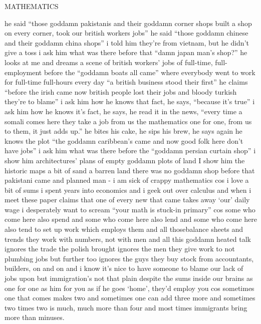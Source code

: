 %
%
%
%
MATHEMATICS

he said
“those goddamn pakistanis and their goddamn corner shops
built a shop on every corner, took our british workers jobs”
he said
“those goddamn chinese and their goddamn china shops”
i told him they’re from vietnam, but he didn’t give a toss
i ask him what was there before that “damn japan man’s shop?”
he looks at me and dreams a scene of british workers’ jobs
of full-time, full-employment before the “goddamn boats all came”
where everybody went to work for full-time full-hours every day
“a british business stood their first”
he claims
“before the irish came
now british people lost their jobs and bloody turkish they're to blame”
i ask him how he knows that fact, he says, “because it’s true”
i ask him how he knows it’s fact, he says, he read it in the news,
“every time a somali comes here they take a job from us
the mathematics one for one, from us to them, it just adds up.”
he bites his cake, he sips his brew, he says again he knows the plot
“the goddamn caribbean’s came and now good folk here don’t have jobs”
i ask him what was there before the “goddamn persian curtain shop”
i show him architectures’ plans
of empty goddamn plots of land
I show him the historic maps
a bit of sand
a barren land
there was no goddamn shop before that pakistani came and planned
man - i am sick of crappy mathematics
cos i love a bit of sums
i spent years into economics
and i geek out over calculus
and when i meet these paper claims
that one of every new that came
takes away ‘our’ daily wage
i desperately want to scream
“your math is stuck-in primary”
cos some who come here also spend
and some who come here also lend
and some who come here also tend
to set up work which employs them
and all thosebalance sheets and trends
they work with numbers, not with men
and all this goddamn heated talk
ignores the trade the polish brought
ignores the men they give work to
not plumbing jobs but further too
ignores the guys they buy stock from
accountants, builders, on and on
and i know it’s nice to have someone
to blame our lack of jobs upon
but immigration’s not that plain
despite the sums inside our brains
as one for one
as him for you
as if he goes ‘home’, they’d employ you
cos sometimes one that comes makes two
and sometimes one can add three more
and sometimes two times two is much, much more than four
and most times immigrants bring more than minuses.

